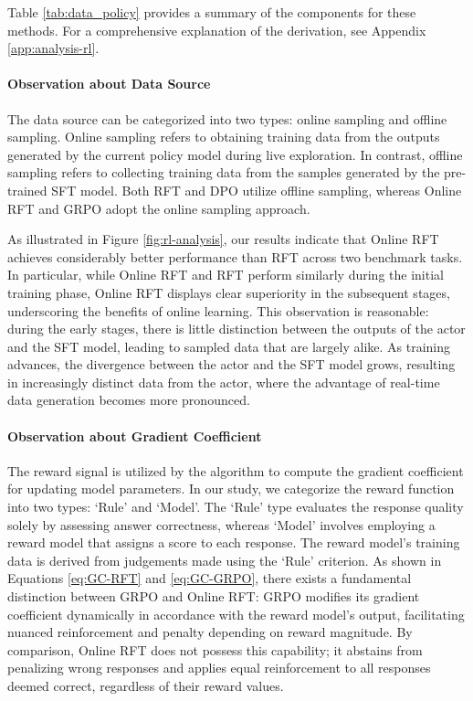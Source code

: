 \begin{itemize}[topsep=0pt]
\begin{itemize}[topsep=0pt]
Table \ref{tab:data_policy} provides a summary of the components for these methods. For a comprehensive explanation of the derivation, see Appendix \ref{app:analysis-rl}.

\paragraph{Observation about Data Source} The data source can be categorized into two types: online sampling and offline sampling. Online sampling refers to obtaining training data from the outputs generated by the current policy model during live exploration. In contrast, offline sampling refers to collecting training data from the samples generated by the pre-trained SFT model. Both RFT and DPO utilize offline sampling, whereas Online RFT and GRPO adopt the online sampling approach.

As illustrated in Figure \ref{fig:rl-analysis}, our results indicate that Online RFT achieves considerably better performance than RFT across two benchmark tasks. In particular, while Online RFT and RFT perform similarly during the initial training phase, Online RFT displays clear superiority in the subsequent stages, underscoring the benefits of online learning. This observation is reasonable: during the early stages, there is little distinction between the outputs of the actor and the SFT model, leading to sampled data that are largely alike. As training advances, the divergence between the actor and the SFT model grows, resulting in increasingly distinct data from the actor, where the advantage of real-time data generation becomes more pronounced.

\paragraph{Observation about Gradient Coefficient} The reward signal is utilized by the algorithm to compute the gradient coefficient for updating model parameters. In our study, we categorize the reward function into two types: ‘Rule’ and ‘Model’. The ‘Rule’ type evaluates the response quality solely by assessing answer correctness, whereas ‘Model’ involves employing a reward model that assigns a score to each response. The reward model’s training data is derived from judgements made using the ‘Rule’ criterion. As shown in Equations \ref{eq:GC-RFT} and \ref{eq:GC-GRPO}, there exists a fundamental distinction between GRPO and Online RFT: GRPO modifies its gradient coefficient dynamically in accordance with the reward model’s output, facilitating nuanced reinforcement and penalty depending on reward magnitude. By comparison, Online RFT does not possess this capability; it abstains from penalizing wrong responses and applies equal reinforcement to all responses deemed correct, regardless of their reward values.


\end{itemize}
\end{itemize}

